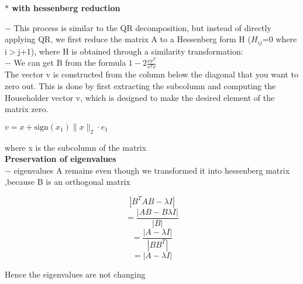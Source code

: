 \documentclass[journal]{IEEEtran}
\begin{document}
\begin{center}
     \textbf{$*$ with hessenberg reduction}
\end{center}
$-$ This process is similar to the QR decomposition, but instead of directly applying QR, we first reduce the matrix 
A to a Hessenberg form H ($H_{ij}$=0 where i$>$j+1), where 
H is obtained through a similarity transformation: \vspace{0.3cm}\\
$-$ We can get B from the formula $1-2\frac{vv^T}{v^Tv}$\vspace{0.3cm}\\
The vector v is constructed from the column below the diagonal that you want to zero out. This is done by first extracting the subcolumn and computing the Householder vector v, which is designed to make the desired element of the matrix zero.
\begin{center}
    $v = x + \text{sign}(x_1) \|x\|_2 \cdot e_1$
\end{center}
where x is the subcolumn of the matrix \vspace{0.3cm}\\
\textbf{Preservation of eigenvalues}\vspace{0.3cm}\\
$-$ eigenvalues A remains even though we transformed it into hessenberg matrix ,because B is an orthogonal matrix
\begin{center}
    \[
|B^T A B - \lambda I|
\]
\[
= \frac{|A B - B \lambda I|}{|B|}
\]
\[
= \frac{|A - \lambda I|}{|B B^T|}
\]
\[
= |A - \lambda I|
\]
\end{center}
Hence the eigenvalues are not changing
\end{document}
